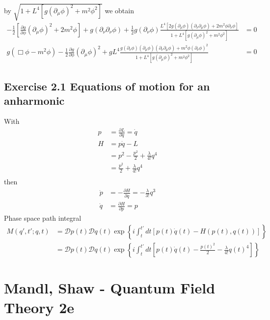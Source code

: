 \documentclass[10pt,a4paper]{book}
\theoremstyle{definition}
\begin{document}
by $\sqrt{1+L^4[g(\partial_\mu\phi)^2+m^2\phi^2]}$ we obtain
\begin{align}
-\frac{1}{2}\left[\frac{\partial g}{\partial\phi}(\partial_\mu\phi)^2+2m^2\phi\right]+g(\partial_\nu\partial_\nu\phi)+\frac{1}{2}g(\partial_\nu\phi)\frac{L^4[2g(\partial_\mu\phi)(\partial_\nu\partial_\mu\phi)+2m^2\phi\partial_\nu\phi]}{1+L^4[g(\partial_\mu\phi)^2+m^2\phi^2]}&=0\\
%
g(\Box\phi-m^2\phi)-\frac{1}{2}\frac{\partial g}{\partial\phi}(\partial_\mu\phi)^2+gL^4\frac{g(\partial_\nu\phi)(\partial_\mu\phi)(\partial_\nu\partial_\mu\phi)+m^2\phi(\partial_\nu\phi)^2}{1+L^4[g(\partial_\mu\phi)^2+m^2\phi^2]}&=0
\end{align}

\subsection{Exercise 2.1 Equations of motion for an anharmonic}
With
\begin{align}
p
&=\frac{\partial L}{\partial \dot{q}}=\dot{q}\\
H
&=p\dot{q}-L\\
&=p^2-\frac{p^2}{2}+\frac{\lambda}{4!}q^4\\
&=\frac{p^2}{2}+\frac{\lambda}{4!}q^4\\
\end{align}
then
\begin{align}
\dot{p}&=-\frac{\partial H}{\partial q}=-\frac{\lambda}{3!}q^3\\
\dot{q}&=\frac{\partial H}{\partial p}=p
\end{align}
Phase space path integral
\begin{align}
M(q',t';q,t)
&=\mathcal{D}p(t)\mathcal{D}q(t)\exp\left\{i\int_t^{t'}dt[p(t)\dot{q}(t)-H(p(t),q(t))]\right\}\\
&=\mathcal{D}p(t)\mathcal{D}q(t)\exp\left\{i\int_t^{t'}dt[p(t)\dot{q}(t)-\frac{p(t)^2}{2}-\frac{\lambda}{4!}q(t)^4]\right\}
\end{align}

\section{{\sc Mandl, Shaw} - Quantum Field Theory 2e}
\end{document}

